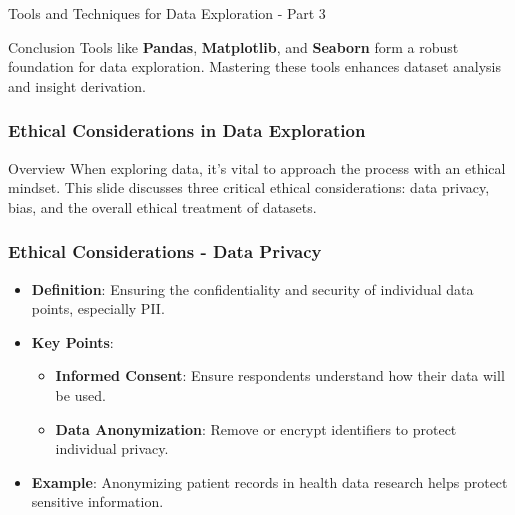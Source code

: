 \documentclass[aspectratio=169]{beamer}
\begin{document}
\begin{frame}[fragile]{Tools and Techniques for Data Exploration - Part 3}
    \begin{block}{Conclusion}
        Tools like \textbf{Pandas}, \textbf{Matplotlib}, and \textbf{Seaborn} form a robust foundation for data exploration.
        Mastering these tools enhances dataset analysis and insight derivation.
    \end{block}
\end{frame}

\begin{frame}[fragile]
    \frametitle{Ethical Considerations in Data Exploration}
    \begin{block}{Overview}
        When exploring data, it's vital to approach the process with an ethical mindset. This slide discusses three critical ethical considerations: 
        data privacy, bias, and the overall ethical treatment of datasets.
    \end{block}
\end{frame}

\begin{frame}[fragile]
    \frametitle{Ethical Considerations - Data Privacy}
    \begin{itemize}
        \item \textbf{Definition}: Ensuring the confidentiality and security of individual data points, especially PII.
        \item \textbf{Key Points}:
        \begin{itemize}
            \item \textbf{Informed Consent}: Ensure respondents understand how their data will be used.
            \item \textbf{Data Anonymization}: Remove or encrypt identifiers to protect individual privacy.
        \end{itemize}
        \item \textbf{Example}: Anonymizing patient records in health data research helps protect sensitive information.
    \end{itemize}
\end{frame}
\end{document}
